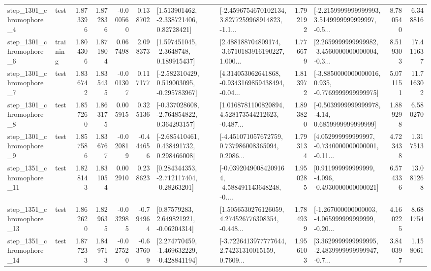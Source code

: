 \begin{tabular}{llrrrrllrlrr}
  step\_1301\_chromophore\_4 &      test &      1.873396 &    1.872836 &     -0.000560 &  0.138702 &     [1.513901462, -2.338721406, 0.82728421] &  [-2.4596754670102134, 3.8277259968914823, -1.1... &       1.792192 &  [-2.2159999999999993, 3.5149999999999997, -0.5... &            8.780540 &          6.348816 \\
  step\_1301\_chromophore\_6 &  training &      1.804306 &    1.871804 &      0.067498 &  2.098373 &      [1.597451045, -2.3648748, 0.189915437] &  [2.488188704809174, -3.6710183916190227, 1.000... &       1.776679 &  [2.2659999999999982, -3.4560000000000004, -0.3... &            8.519303 &         17.411637 \\
  step\_1301\_chromophore\_7 &      test &      1.836742 &    1.835435 &     -0.001307 &  0.117177 &   [-2.582310429, 0.519003095, -0.295783967] &  [4.314053062641868, -0.9343169859438494, -0.04... &       1.813972 &  [-3.8850000000000016, 0.935, -0.7769999999999975] &            5.071151 &         11.716302 \\
  step\_1301\_chromophore\_8 &      test &      1.857260 &    1.863175 &      0.005915 &  0.325136 &   [-0.337028608, -2.764854822, 0.364293157] &  [1.0168781100820894, 4.528173544212623, -0.487... &       1.893820 &   [-0.5039999999999978, -4.14, 0.6859999999999999] &            1.889298 &          6.580270 \\
  step\_1301\_chromophore\_9 &      test &      1.857586 &    1.836767 &     -0.020819 & -0.444656 &    [-2.685410461, 0.438491732, 0.298466008] &  [-4.451071057672759, 0.737986008365094, 0.2086... &       1.793134 &  [4.052999999999997, -0.7340000000000001, -0.11... &            4.723438 &          1.317513 \\
 step\_1351\_chromophore\_11 &      test &      1.828143 &    1.831054 &      0.002910 &  0.238623 &    [0.284344353, -2.712117404, -0.28263201] &  [-0.03920490084209164, -4.588491143648248, -0.... &       1.950285 &   [0.911999999999999, -4.096, -0.4930000000000021] &            6.574336 &         13.081268 \\
 step\_1351\_chromophore\_13 &      test &      1.862620 &    1.829635 &     -0.032985 & -0.794964 &      [0.87579283, 2.649821921, -0.06204314] &  [1.5056530276126059, 4.274526776308354, -0.448... &       1.784939 &  [-1.267000000000003, -4.065999999999999, -0.20... &            4.160225 &          8.681754 \\
 step\_1351\_chromophore\_14 &      test &      1.877233 &    1.849713 &     -0.027520 & -0.637609 &   [2.274770459, -1.469632229, -0.428841194] &  [-3.7226413977777644, 2.74231310015159, 0.7609... &       1.956103 &  [3.3629999999999995, -2.4839999999999947, -0.7... &            3.840397 &          1.158061 \\

\end{tabular}
